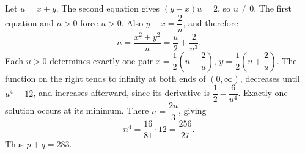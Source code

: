 Let $u=x+y$. The second equation gives $(y-x)u=2$, so $u\ne0$. The first equation and $n>0$ force $u>0$. Also $y-x=\dfrac{2}{u}$, and therefore
\[
n=\dfrac{x^2+y^2}{u}=\dfrac{u}{2}+\dfrac{2}{u^3}.
\]
Each $u>0$ determines exactly one pair $x=\dfrac{1}{2}(u-\dfrac{2}{u})$, $y=\dfrac{1}{2}(u+\dfrac{2}{u})$.
The function on the right tends to infinity at both ends of $(0,\infty)$, decreases until $u^4=12$, and increases afterward, since its derivative is $\dfrac{1}{2}-\dfrac{6}{u^4}$. Exactly one solution occurs at its minimum. There $n=\dfrac{2u}{3}$, giving
\[
n^4=\dfrac{16}{81}\cdot12=\dfrac{256}{27}.
\]
Thus $\boxed{p+q=283}$.
